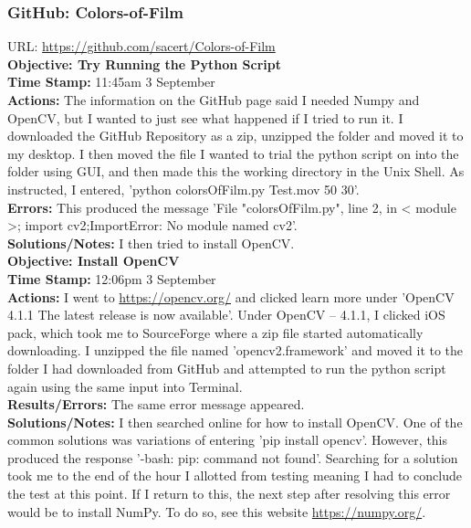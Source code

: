 \documentclass{article}
\begin{document}
\subsubsection{GitHub: Colors-of-Film}
URL: \url{https://github.com/sacert/Colors-of-Film}\\

\textbf{Objective: Try Running the Python Script}\\
\textbf{Time Stamp:} 11:45am 3 September\\
\textbf{Actions:} The information on the GitHub page said I needed Numpy and OpenCV, but I wanted to just see what happened if I tried to run it. I downloaded the GitHub Repository as a zip, unzipped the folder and moved it to my desktop. I then moved the file I wanted to trial the python script on into the folder using GUI, and then made this the working directory in the Unix Shell. As instructed, I entered, 'python colorsOfFilm.py Test.mov 50 30'.\\
\textbf{Errors:} This produced the message 'File "colorsOfFilm.py", line 2, in \textless{} module \textgreater{}; import cv2;ImportError: No module named cv2'.\\
\textbf{Solutions/Notes:} I then tried to install OpenCV.\\

\textbf{Objective: Install OpenCV}\\
\textbf{Time Stamp:} 12:06pm 3 September\\
\textbf{Actions:} I went to \url{https://opencv.org/} and clicked learn more under 'OpenCV 4.1.1 The latest release is now available'. Under OpenCV – 4.1.1, I clicked iOS pack, which took me to SourceForge where a zip file started automatically downloading. I unzipped the file named 'opencv2.framework' and moved it to the folder I had downloaded from GitHub and attempted to run the python script again using the same input into Terminal. \\
\textbf{Results/Errors:} The same error message appeared.\\
\textbf{Solutions/Notes:} I then searched online for how to install OpenCV. One of the common solutions was variations of entering 'pip install opencv'. However, this produced the response '-bash: pip: command not found'. Searching for a solution took me to the end of the hour I allotted from testing meaning I had to conclude the test at this point. If I return to this, the next step after resolving this error would be to install NumPy. To do so, see this website \url{https://numpy.org/}.\\
\end{document}
